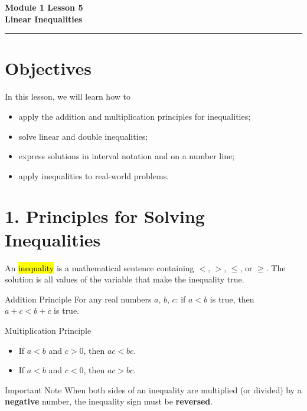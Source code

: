 \documentclass[12pt]{article}
\newcommand{\funhl}[1]{\sethlcolor{highlight}\hl{#1}}
\begin{document}
\handwriting

\begin{center}
    \Large\textbf{\color{primaryblue}Module 1 Lesson 5\\Linear Inequalities} \\
    \vspace{0.2cm}
    \hrule
\end{center}

\section*{Objectives}

\begin{friendlyrule}{In this lesson, we will learn how to}
\begin{itemize}
    \item apply the addition and multiplication principles for inequalities;
    \item solve linear and double inequalities;
    \item express solutions in interval notation and on a number line;
    \item apply inequalities to real-world problems.
\end{itemize}
\end{friendlyrule}

\section*{1. Principles for Solving Inequalities}

An \funhl{inequality} is a mathematical sentence containing $<$, $>$, $\le$, or $\ge$. The solution is all values of the variable that make the inequality true.

\begin{friendlyrule}{Addition Principle}
For any real numbers $a$, $b$, $c$: if $a<b$ is true, then $a+c<b+c$ is true.
\end{friendlyrule}

\begin{friendlyrule}{Multiplication Principle}
\begin{itemize}
    \item[(a)] If $a<b$ and $c>0$, then $ac<bc$.
    \item[(b)] If $a<b$ and $c<0$, then $ac>bc$.
\end{itemize}
\end{friendlyrule}

\begin{friendlyrule}{Important Note}
When both sides of an inequality are multiplied (or divided) by a \textbf{negative} number, the inequality sign must be \textbf{reversed}.
\end{friendlyrule}
\end{document}

